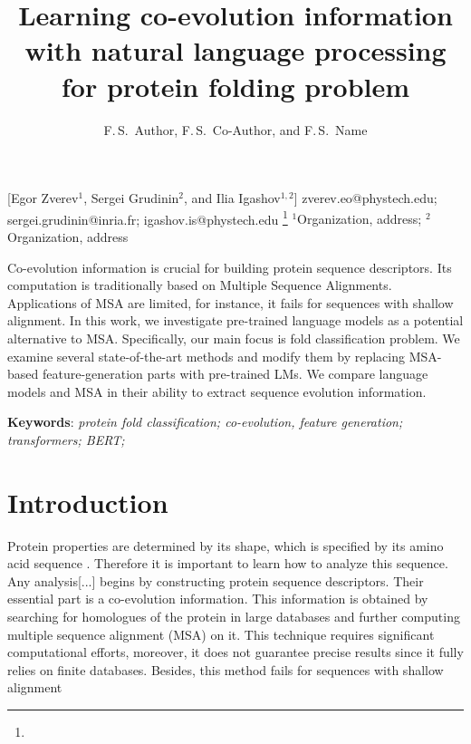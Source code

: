 \documentclass[12pt, twoside]{article}
\begin{document}
\English
\title
	[] %
    { Learning co-evolution information with natural language processing for protein folding problem} %
\author
	[F.\,S.~Author] %
	{F.\,S.~Author, F.\,S.~Co-Author, and F.\,S.~Name} %
    [Egor Zverev$^1$, Sergei Grudinin$^2$, and Ilia Igashov$^{1, 2}$] %
\email
    {zverev.eo@phystech.edu; sergei.grudinin@inria.fr; igashov.is@phystech.edu}
\thanks
    {}
\organization
    {$^1$Organization, address;
     $^2$Organization, address}
\abstract
    {Co-evolution information is crucial for building protein sequence descriptors. Its computation is traditionally based on Multiple Sequence Alignments. Applications of MSA are limited, for instance, it fails for sequences with shallow alignment. In this work, we investigate pre-trained language models  as a potential alternative to MSA. Specifically, our main focus is fold classification problem. We examine several  state-of-the-art  methods  and  modify  them  by  replacing  MSA-based  feature-generation parts with pre-trained LMs. We compare language models and MSA in their ability to extract sequence evolution information.

		
	\noindent
    	\textbf{Keywords}: \emph{protein fold classification; co-evolution, feature generation; transformers; BERT;  }}





\maketitle
\linenumbers

\section{Introduction}
\noindent %




Protein properties are determined by its shape, which is specified by its amino acid sequence \cite{cellbiology}. Therefore it is important to learn how to analyze this sequence.
Any analysis[...] begins by constructing protein sequence descriptors. Their essential part is a co-evolution information. This information is obtained by searching for homologues of the protein in large databases and further computing multiple sequence alignment (MSA) on it. This technique requires significant computational efforts, moreover, it does not guarantee precise results since it fully relies on finite databases. Besides, this method fails for sequences with shallow alignment 
\end{document}

